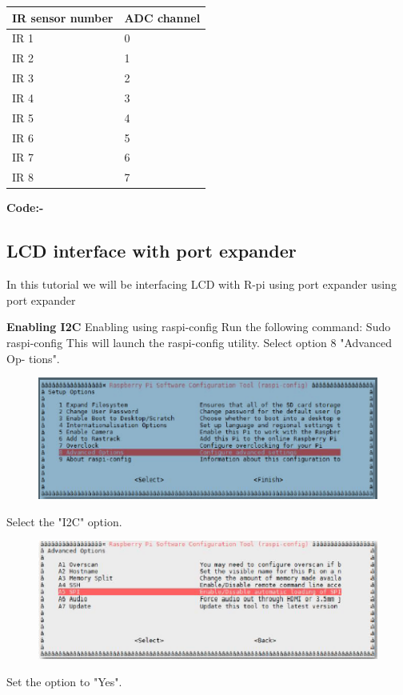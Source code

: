 \documentclass[11pt,a4paper]{report}
\begin{document}
\begin{flushleft}
\begin{tabular}{ |p{3cm}|p{3cm}| }
 \hline
 IR sensor number& ADC channel\\
 \hline
 IR 1&0\\
 \hline
 IR 2&1\\
 \hline
 IR 3&2\\
 \hline
 IR 4&3\\
 \hline
 IR 5&4\\
 \hline
 IR 6&5\\
 \hline
 IR 7&6\\
 \hline
 IR 8&7\\
 \hline
\end{tabular}

		
	\newpage
	\flushleft
	\textbf{Code:-}
	\vspace{0.3cm}
	
	\newpage
	\subsection{LCD interface with port expander}
	In this tutorial we will be interfacing LCD with R-pi using port expander using port expander\newline
	
	\textbf{Enabling I2C}\vspace{0.2cm}\newline
	Enabling using raspi-config\newline
	Run the following command:\newline
Sudo raspi-config\newline
This will launch the raspi-config utility. Select option 8 "Advanced Op-
tions".\newline
\begin{figure}[h!]
		\includegraphics[scale=0.7]{spi1.png}
		\centering
		\caption{}
	    \end{figure}\newline
Select the "I2C" option.\newline
\begin{figure}[h!]
		\includegraphics[scale=0.7]{spi2.png}
		\centering
		\caption{}
	    \end{figure}\newline
	    Set the option to "Yes".\newline
	   

\end{flushleft}
\end{document}
